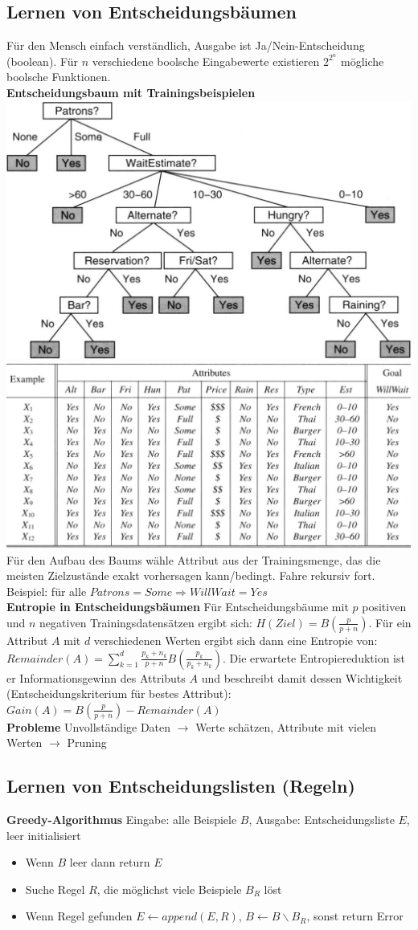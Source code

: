 \documentclass[12pt]{article}
\begin{document}
	\subsection{Lernen von Entscheidungsbäumen}
	Für den Mensch einfach verständlich, Ausgabe ist Ja/Nein-Entscheidung (boolean). Für $n$ verschiedene boolsche Eingabewerte existieren $2^{2^n}$ mögliche boolsche Funktionen.\\
	\textbf{Entscheidungsbaum mit Trainingsbeispielen}\\
	\includegraphics[width=0.5\linewidth]{figures/entscheidungsbaum.JPG}
	\includegraphics[width=0.5\linewidth]{figures/entscheidungsbaum-trainingsbeispiele.JPG}\\
	Für den Aufbau des Baums wähle Attribut aus der Trainingsmenge, das die meisten Zielzustände exakt vorhersagen kann/bedingt. Fahre rekursiv fort. Beispiel: für alle $Patrons = Some \Rightarrow WillWait = Yes$\\
	\textbf{Entropie in Entscheidungsbäumen} Für Entscheidungsbäume mit $p$ positiven und $n$ negativen Trainingsdatensätzen ergibt sich: $H(Ziel) = B(\frac{p}{p+n})$. Für ein Attribut $A$ mit $d$ verschiedenen Werten ergibt sich dann eine Entropie von: $Remainder(A) = \sum_{k=1}^{d} \frac{p_k + n_k}{p+n} B(\frac{p_k}{p_k + n_k})$. Die erwartete Entropiereduktion ist er Informationsgewinn des Attributs $A$ und beschreibt damit dessen Wichtigkeit (Entscheidungskriterium für bestes Attribut): $Gain(A) = B(\frac{p}{p+n}) - Remainder(A)$\\
	\textbf{Probleme} Unvollständige Daten $\rightarrow$ Werte schätzen, Attribute mit vielen Werten $\rightarrow$ Pruning\\
	
	\subsection{Lernen von Entscheidungslisten (Regeln)}
	\textbf{Greedy-Algorithmus} Eingabe: alle Beispiele $B$, Ausgabe: Entscheidungsliste $E$, leer initialisiert
	\begin{itemize}
		\item Wenn $B$ leer dann return $E$
		\item Suche Regel $R$, die möglichst viele Beispiele $B_R$ löst
		\item Wenn Regel gefunden $E \leftarrow append(E, R)$, $B \leftarrow B \backslash B_R$, sonst return Error
	\end{itemize}
\end{document}
